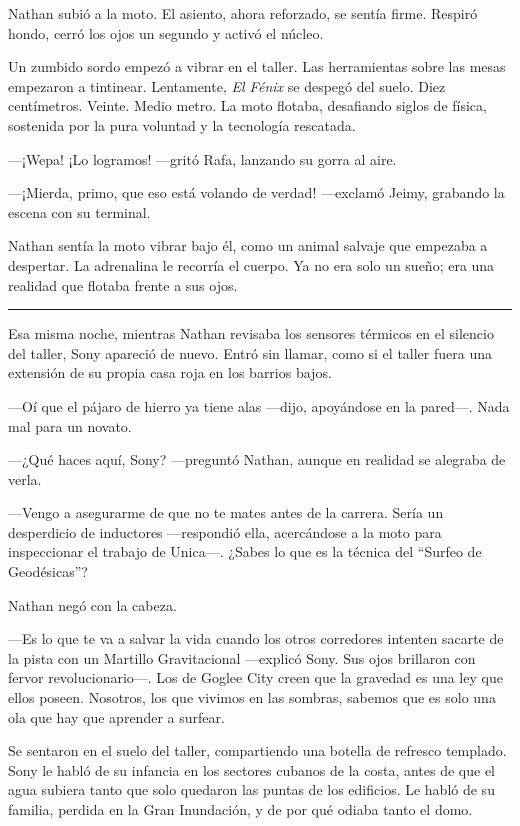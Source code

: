 \documentclass[12pt,a4paper]{book}
\begin{document}
Nathan subió a la moto. El asiento, ahora reforzado, se sentía firme. Respiró hondo, cerró los ojos un segundo y activó el núcleo.

Un zumbido sordo empezó a vibrar en el taller. Las herramientas sobre las mesas empezaron a tintinear. Lentamente, \textit{El Fénix} se despegó del suelo. Diez centímetros. Veinte. Medio metro. La moto flotaba, desafiando siglos de física, sostenida por la pura voluntad y la tecnología rescatada.

---¡Wepa! ¡Lo logramos! ---gritó Rafa, lanzando su gorra al aire.

---¡Mierda, primo, que eso está volando de verdad! ---exclamó Jeimy, grabando la escena con su terminal.

Nathan sentía la moto vibrar bajo él, como un animal salvaje que empezaba a despertar. La adrenalina le recorría el cuerpo. Ya no era solo un sueño; era una realidad que flotaba frente a sus ojos.

\bigskip
\noindent\rule{\textwidth}{0.4pt}
\bigskip

Esa misma noche, mientras Nathan revisaba los sensores térmicos en el silencio del taller, Sony apareció de nuevo. Entró sin llamar, como si el taller fuera una extensión de su propia casa roja en los barrios bajos.

---Oí que el pájaro de hierro ya tiene alas ---dijo, apoyándose en la pared---. Nada mal para un novato.

---¿Qué haces aquí, Sony? ---preguntó Nathan, aunque en realidad se alegraba de verla.

---Vengo a asegurarme de que no te mates antes de la carrera. Sería un desperdicio de inductores ---respondió ella, acercándose a la moto para inspeccionar el trabajo de Unica---. ¿Sabes lo que es la técnica del ``Surfeo de Geodésicas''?

Nathan negó con la cabeza.

---Es lo que te va a salvar la vida cuando los otros corredores intenten sacarte de la pista con un Martillo Gravitacional ---explicó Sony. Sus ojos brillaron con fervor revolucionario---. Los de Goglee City creen que la gravedad es una ley que ellos poseen. Nosotros, los que vivimos en las sombras, sabemos que es solo una ola que hay que aprender a surfear.

Se sentaron en el suelo del taller, compartiendo una botella de refresco templado. Sony le habló de su infancia en los sectores cubanos de la costa, antes de que el agua subiera tanto que solo quedaron las puntas de los edificios. Le habló de su familia, perdida en la Gran Inundación, y de por qué odiaba tanto el domo.
\end{document}
